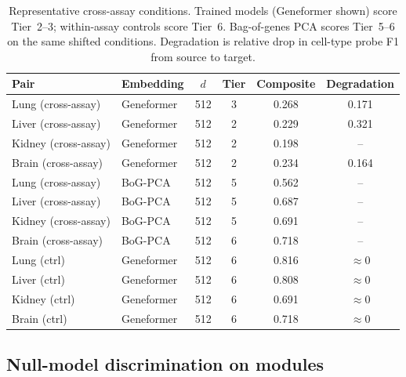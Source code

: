\documentclass[11pt]{article}
\begin{document}
\begin{table}[h!]
\centering
\caption{Representative cross-assay conditions. Trained models (Geneformer shown) score Tier~2--3; within-assay controls score Tier~6. Bag-of-genes PCA scores Tier~5--6 on the same shifted conditions. Degradation is relative drop in cell-type probe F1 from source to target.}
\label{tab:separation}
\small
\begin{tabular}{@{}llcccc@{}}
\toprule
Pair & Embedding & $d$ & Tier & Composite & Degradation \\
\midrule
Lung (cross-assay) & Geneformer & 512 & 3 & 0.268 & 0.171 \\
Liver (cross-assay) & Geneformer & 512 & 2 & 0.229 & 0.321 \\
Kidney (cross-assay) & Geneformer & 512 & 2 & 0.198 & -- \\
Brain (cross-assay) & Geneformer & 512 & 2 & 0.234 & 0.164 \\
\midrule
Lung (cross-assay) & BoG-PCA & 512 & 5 & 0.562 & -- \\
Liver (cross-assay) & BoG-PCA & 512 & 5 & 0.687 & -- \\
Kidney (cross-assay) & BoG-PCA & 512 & 5 & 0.691 & -- \\
Brain (cross-assay) & BoG-PCA & 512 & 6 & 0.718 & -- \\
\midrule
Lung (ctrl) & Geneformer & 512 & 6 & 0.816 & $\approx 0$ \\
Liver (ctrl) & Geneformer & 512 & 6 & 0.808 & $\approx 0$ \\
Kidney (ctrl) & Geneformer & 512 & 6 & 0.691 & $\approx 0$ \\
Brain (ctrl) & Geneformer & 512 & 6 & 0.718 & $\approx 0$ \\
\bottomrule
\end{tabular}
\end{table}

\subsection{Null-model discrimination on modules}
\end{document}
